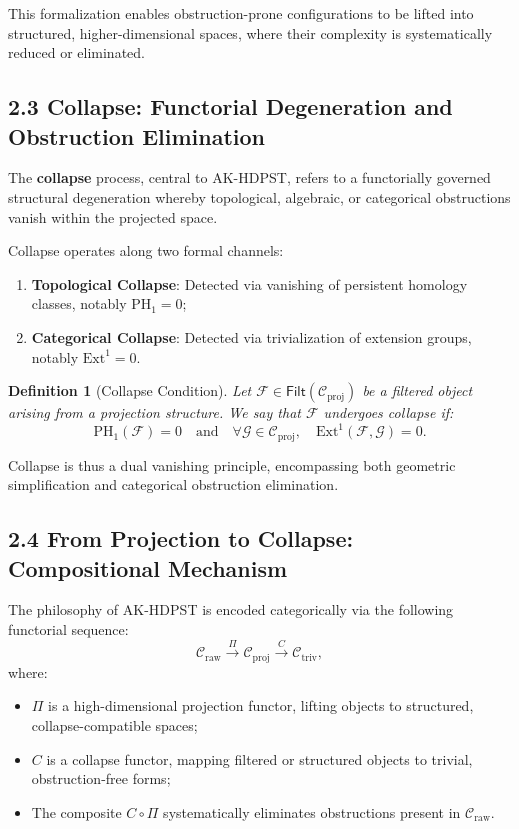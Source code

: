 \documentclass[11pt]{article}
\newtheorem{definition}[theorem]{Definition}
\begin{document}
This formalization enables obstruction-prone configurations to be lifted into structured, higher-dimensional spaces, where their complexity is systematically reduced or eliminated.

\subsection*{2.3 Collapse: Functorial Degeneration and Obstruction Elimination}

The \textbf{collapse} process, central to AK-HDPST, refers to a functorially governed structural degeneration whereby topological, algebraic, or categorical obstructions vanish within the projected space.

Collapse operates along two formal channels:

\begin{enumerate}
    \item \textbf{Topological Collapse}: Detected via vanishing of persistent homology classes, notably \( \mathrm{PH}_1 = 0 \);
    \item \textbf{Categorical Collapse}: Detected via trivialization of extension groups, notably \( \mathrm{Ext}^1 = 0 \).
\end{enumerate}

\begin{definition}[Collapse Condition]
Let \( \mathcal{F} \in \mathsf{Filt}(\mathcal{C}_{\mathrm{proj}}) \) be a filtered object arising from a projection structure.  
We say that \( \mathcal{F} \) undergoes \emph{collapse} if:
\[
\mathrm{PH}_1(\mathcal{F}) = 0 \quad \text{and} \quad \forall \mathcal{G} \in \mathcal{C}_{\mathrm{proj}}, \quad \mathrm{Ext}^1(\mathcal{F}, \mathcal{G}) = 0.
\]
\end{definition}

Collapse is thus a dual vanishing principle, encompassing both geometric simplification and categorical obstruction elimination.

\subsection*{2.4 From Projection to Collapse: Compositional Mechanism}

The philosophy of AK-HDPST is encoded categorically via the following functorial sequence:
\[
\mathcal{C}_{\mathrm{raw}} 
\overset{\Pi}{\longrightarrow} 
\mathcal{C}_{\mathrm{proj}} 
\overset{C}{\longrightarrow} 
\mathcal{C}_{\mathrm{triv}},
\]
where:

\begin{itemize}
    \item \( \Pi \) is a high-dimensional projection functor, lifting objects to structured, collapse-compatible spaces;
    \item \( C \) is a collapse functor, mapping filtered or structured objects to trivial, obstruction-free forms;
    \item The composite \( C \circ \Pi \) systematically eliminates obstructions present in \( \mathcal{C}_{\mathrm{raw}} \).
\end{itemize}
\end{document}
